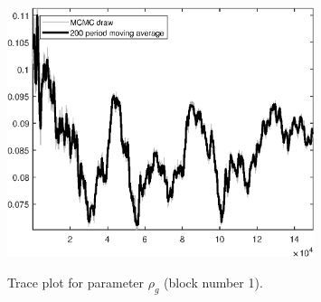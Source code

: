 \begin{figure}[H]
\centering
  \includegraphics[width=0.8\textwidth]{BRS_sectoral_wo_gmf/graphs/TracePlot_rho_g_blck_1}\\
    \caption{Trace plot for parameter ${\rho_g}$ (block number 1).}
\end{figure}
